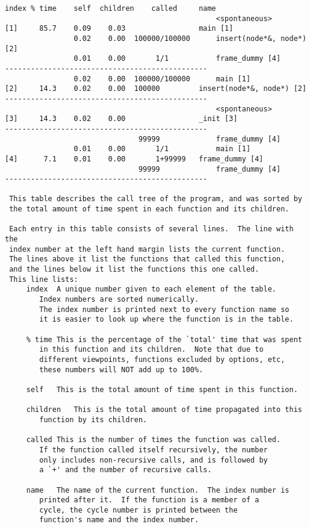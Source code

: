 \documentclass[pdf, unicode, 12pt, a4paper,oneside,fleqn]{article}
\begin{document}
\begin{lstlisting}
index % time    self  children    called     name
                                                 <spontaneous>
[1]     85.7    0.09    0.03                 main [1]
                0.02    0.00  100000/100000      insert(node*&, node*) [2]
                0.01    0.00       1/1           frame_dummy [4]
-----------------------------------------------
                0.02    0.00  100000/100000      main [1]
[2]     14.3    0.02    0.00  100000         insert(node*&, node*) [2]
-----------------------------------------------
                                                 <spontaneous>
[3]     14.3    0.02    0.00                 _init [3]
-----------------------------------------------
                               99999             frame_dummy [4]
                0.01    0.00       1/1           main [1]
[4]      7.1    0.01    0.00       1+99999   frame_dummy [4]
                               99999             frame_dummy [4]
-----------------------------------------------

 This table describes the call tree of the program, and was sorted by
 the total amount of time spent in each function and its children.

 Each entry in this table consists of several lines.  The line with the
 index number at the left hand margin lists the current function.
 The lines above it list the functions that called this function,
 and the lines below it list the functions this one called.
 This line lists:
     index	A unique number given to each element of the table.
		Index numbers are sorted numerically.
		The index number is printed next to every function name so
		it is easier to look up where the function is in the table.

     % time	This is the percentage of the `total' time that was spent
		in this function and its children.  Note that due to
		different viewpoints, functions excluded by options, etc,
		these numbers will NOT add up to 100%.

     self	This is the total amount of time spent in this function.

     children	This is the total amount of time propagated into this
		function by its children.

     called	This is the number of times the function was called.
		If the function called itself recursively, the number
		only includes non-recursive calls, and is followed by
		a `+' and the number of recursive calls.

     name	The name of the current function.  The index number is
		printed after it.  If the function is a member of a
		cycle, the cycle number is printed between the
		function's name and the index number.



\end{lstlisting}
\end{document}
